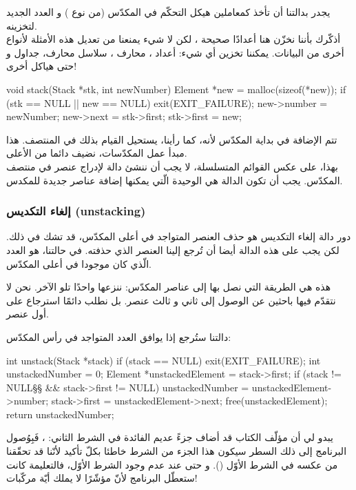 يجدر بدالتنا
أن تأخذ كمعاملين هيكل التحكّم في المكدّس (من نوع
)
و العدد الجديد لتخزينه.\\
أذكّرك بأننا نخزّن هنا أعدادًا صحيحة
،
لكن لا شيء يمنعنا من تعديل هذه الأمثلة لأنواع أخرى من البيانات. يمكننا تخزين أي شيء: أعداد
،
محارف
،
سلاسل محارف، جداول و حتى هياكل أخرى!

\begin{Csource}
void stack(Stack *stk, int newNumber)
{
	Element *new = malloc(sizeof(*new));
	if (stk == NULL || new == NULL)
	{
		exit(EXIT_FAILURE);
	}
	new->number = newNumber;
	new->next = stk->first;
	stk->first = new;
}
\end{Csource}

تتم الإضافة في بداية المكدّس لأنه، كما رأينا، يستحيل القيام بذلك في المنتصف. هذا مبدأ عمل المكدّسات، نضيف دائما من الأعلى. \\
بهذا، على عكس القوائم المتسلسلة، لا يجب أن ننشئ دالة لإدراج عنصر في منتصف المكدّس. يجب أن تكون الدالة
هي الوحيدة الّتي يمكنها إضافة عناصر جديدة للمكدس.

\subsubsection{إلغاء التكديس (\textenglish{unstacking})}

دور دالة إلغاء التكديس هو حذف العنصر المتواجد في أعلى المكدّس، قد تشك في ذلك. لكن يجب على هذه الدالة أيضا أن تُرجع إلينا العنصر الذي حذفته. في حالتنا، هو العدد الّذي كان موجودا في أعلى المكدّس.

هذه هي الطريقة التي نصل بها إلى عناصر المكدّس: ننزعها واحدًا تلو الآخر. نحن لا نتقدّم فيها باحثين عن الوصول إلى ثاني و ثالث عنصر. بل نطلب دائمًا استرجاع على أول عنصر.

دالتنا
ستُرجع إذا
يوافق العدد المتواجد في رأس المكدّس:

\begin{Csource}
int unstack(Stack *stack)
{
	if (stack == NULL)
	{
		exit(EXIT_FAILURE);
	}
	int unstackedNumber = 0;
	Element *unstackedElement = stack->first;
	if (stack != NULL§\footnotemark§ && stack->first != NULL)
	{
		unstackedNumber = unstackedElement->number;
		stack->first = unstackedElement->next;
		free(unstackedElement);
	}
	return unstackedNumber;
}
\end{Csource}

\begin{tcolorbox}[title={\footnotemark[1]ملاحظة مُرَاجِع الكتاب}, colback=orange!20, colframe=orange!70, fontupper=\small, coltitle=white, fonttitle=\normalsize, attach title]
يبدو لي أن مؤلّف الكتاب قد أضاف جزءً عديم الفائدة في الشرط الثاني:
،
فَبِوُصول البرنامج إلى ذلك السطر سيكون هذا الجزء من الشرط خاطئا بكلّ تأكيد لأنّنا قد تحقّقنا من عكسه في الشرط الأوّل 
().
و حتى عند عدم وجود الشرط الأوّل، فالتعليمة
كانت ستعطّل البرنامج لأنّ مؤشّرًا
لا يملك أيّة مركّبات!
\end{tcolorbox}

